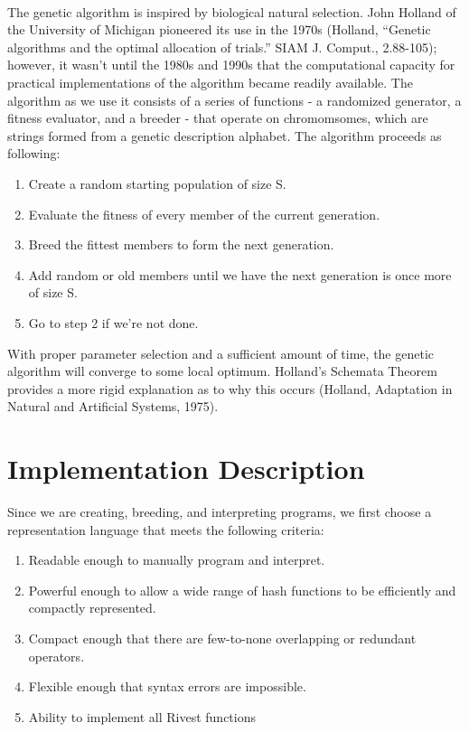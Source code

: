 \documentclass{article}
\begin{document}
\paragraph{}
The genetic algorithm is inspired by biological natural selection. John Holland of the University of Michigan pioneered its use in the 1970s (Holland, “Genetic algorithms and the optimal allocation of trials.” SIAM J. Comput., 2.88-105); however, it wasn't until the 1980s and 1990s that the computational capacity for practical implementations of the algorithm became readily available. The algorithm as we use it consists of a series of functions - a randomized generator, a fitness evaluator, and a breeder - that operate on chromomsomes, which are strings formed from a genetic description alphabet. The algorithm proceeds as following:
\begin{enumerate}
	\item Create a random starting population of size S.
	\item Evaluate the fitness of every member of the current generation.
	\item Breed the fittest members to form the next generation.
	\item Add random or old members until we have the next generation is once more of size S.
	\item Go to step 2 if we're not done.
\end{enumerate}

With proper parameter selection and a sufficient amount of time, the genetic algorithm will converge to some local optimum. Holland's Schemata Theorem provides a more rigid explanation as to why this occurs (Holland, Adaptation in Natural and Artificial Systems, 1975).

\section{Implementation Description}
Since we are creating, breeding, and interpreting programs, we first choose a representation language that meets the following criteria:

\begin{enumerate}
\item Readable enough to manually program and interpret.
\item Powerful enough to allow a wide range of hash functions to be efficiently and compactly represented.
\item Compact enough that there are few-to-none overlapping or redundant operators.
\item Flexible enough that syntax errors are impossible.
\item Ability to implement all Rivest functions
\end{enumerate}
\end{document}
